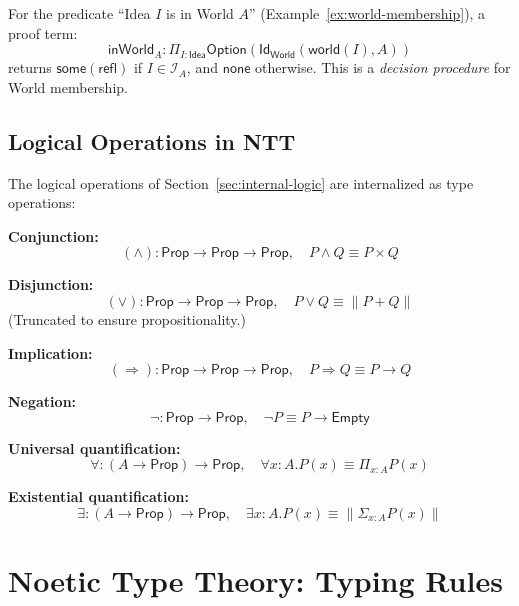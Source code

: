 \begin{example}
\label{ex:noetic-predicate-proof}
For the predicate ``Idea $I$ is in World $A$'' (Example~\ref{ex:world-membership}),
a proof term:
\[
  \mathsf{inWorld}_A : \Pi_{I : \mathsf{Idea}} \mathsf{Option}(\mathsf{Id}_{\mathsf{World}}(\mathsf{world}(I), A))
\]
returns $\mathsf{some}(\mathsf{refl})$ if $I \in \mathcal{I}_A$, and $\mathsf{none}$ otherwise.
This is a \emph{decision procedure} for World membership.
\end{example}

\subsection{Logical Operations in NTT}
\label{subsec:logical-ops-ntt}

\begin{definition}
\label{def:internal-logical-ops}
The logical operations of Section~\ref{sec:internal-logic} are internalized as type operations:

\textbf{Conjunction:}
\[
  (\land) : \mathsf{Prop} \to \mathsf{Prop} \to \mathsf{Prop}, \quad
  P \land Q \equiv P \times Q
\]

\textbf{Disjunction:}
\[
  (\lor) : \mathsf{Prop} \to \mathsf{Prop} \to \mathsf{Prop}, \quad
  P \lor Q \equiv \|P + Q\|
\]
(Truncated to ensure propositionality.)

\textbf{Implication:}
\[
  (\Rightarrow) : \mathsf{Prop} \to \mathsf{Prop} \to \mathsf{Prop}, \quad
  P \Rightarrow Q \equiv P \to Q
\]

\textbf{Negation:}
\[
  \neg : \mathsf{Prop} \to \mathsf{Prop}, \quad
  \neg P \equiv P \to \mathsf{Empty}
\]

\textbf{Universal quantification:}
\[
  \forall : (A \to \mathsf{Prop}) \to \mathsf{Prop}, \quad
  \forall x : A. P(x) \equiv \Pi_{x:A} P(x)
\]

\textbf{Existential quantification:}
\[
  \exists : (A \to \mathsf{Prop}) \to \mathsf{Prop}, \quad
  \exists x : A. P(x) \equiv \|\Sigma_{x:A} P(x)\|
\]
\end{definition}

\section{Noetic Type Theory: Typing Rules}
\label{sec:noetic-type-theory}

